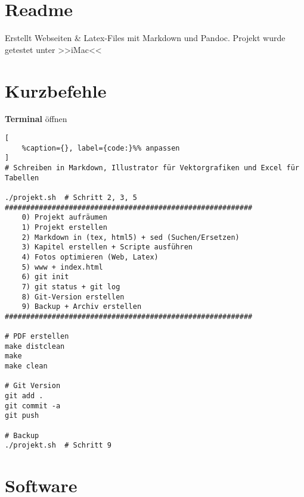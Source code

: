 \section{Readme}\label{readme}

Erstellt Webseiten \& Latex-Files mit Markdown und Pandoc. Projekt wurde
getestet unter >>iMac<<

\section{Kurzbefehle}\label{kurzbefehle}

\textbf{Terminal} öffnen

\lstset{language=Bash}%
\begin{lstlisting}[
	%caption={}, label={code:}%% anpassen
]
# Schreiben in Markdown, Illustrator für Vektorgrafiken und Excel für Tabellen

./projekt.sh  # Schritt 2, 3, 5
##########################################################
    0) Projekt aufräumen
    1) Projekt erstellen
    2) Markdown in (tex, html5) + sed (Suchen/Ersetzen)
    3) Kapitel erstellen + Scripte ausführen
    4) Fotos optimieren (Web, Latex)
    5) www + index.html
    6) git init
    7) git status + git log
    8) Git-Version erstellen
    9) Backup + Archiv erstellen
##########################################################

# PDF erstellen
make distclean
make
make clean

# Git Version
git add .
git commit -a
git push

# Backup
./projekt.sh  # Schritt 9
\end{lstlisting}

\section{Software}\label{software}

